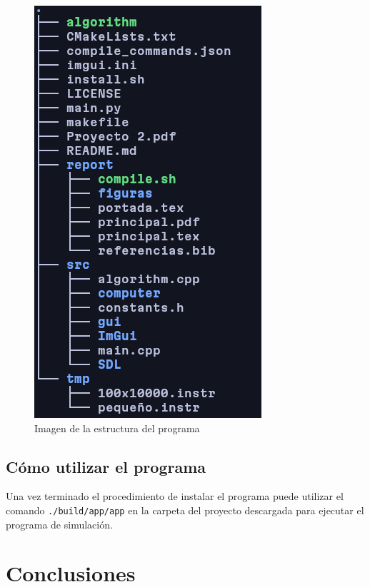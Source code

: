 \documentclass{report}
\begin{document}
\begin{figure}[h]
	\centering
	\includegraphics[width=0.8\linewidth]{figuras/estructura.png}
	\caption{Imagen de la estructura del programa }
	\label{fig:estructura}
\end{figure}

\section{Cómo utilizar el programa}
Una vez terminado el procedimiento de instalar el programa puede utilizar el comando \texttt{./build/app/app} en la carpeta del proyecto descargada para ejecutar el programa de simulación.

\chapter{Conclusiones}
\end{document}
